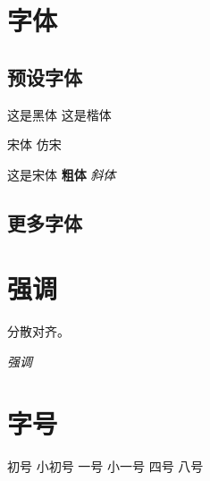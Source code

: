\documentclass[UTF8]{ctexart}
\begin{document}
    \section{字体}
        \subsection{预设字体}
            {这是黑体}\newline
            {这是楷体}
            
            {\songti 宋体} \newline
            {\fangsong 仿宋} 
            
            {这是宋体}\newline
            \textbf{粗体} \quad \textit{斜体}       %

        \subsection{更多字体}
        
    \section{强调}
        \begin{CJKfilltwosides}{5cm}
            分散对齐。
        \end{CJKfilltwosides}\newline
        \emph{强调}

    \section{字号}
        { 初号}\newline
        { 小初号}\newline
        { 一号}\newline
        { 小一号}\newline
        { 四号}\newline
        { 八号}\newline
\end{document}
